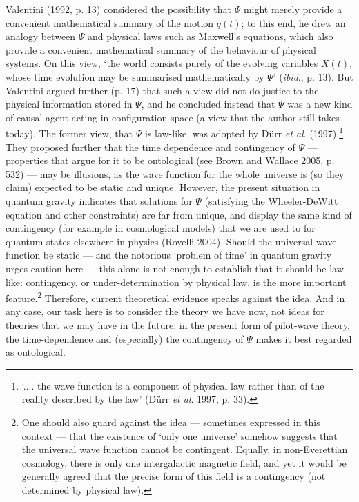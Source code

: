 \documentclass{article}%
\begin{document}
Valentini (1992, p. 13) considered the possibility that $\Psi$ might merely
provide a convenient mathematical summary of the motion $q(t)$; to this end,
he drew an analogy between $\Psi$ and physical laws such as Maxwell's
equations, which also provide a convenient mathematical summary of the
behaviour of physical systems. On this view, `the world consists purely of the
evolving variables $X(t)$, whose time evolution may be summarised
mathematically by $\Psi$' (\textit{ibid}., p. 13). But Valentini argued
further (p. 17) that such a view did not do justice to the physical
information stored in $\Psi$, and he concluded instead that $\Psi$ was a new
kind of causal agent acting in configuration space (a view that the author
still takes today). The former view, that $\Psi$ is law-like, was adopted by
D\"{u}rr \textit{et al}. (1997).\footnote{`.... the wave function is a
component of physical law rather than of the reality described by the law'
(D\"{u}rr \textit{et al}. 1997, p. 33).} They proposed further that the time
dependence and contingency of $\Psi$ --- properties that argue for it to be
ontological (see Brown and Wallace 2005, p. 532) --- may be illusions, as the
wave function for the whole universe is (so they claim) expected to be static
and unique. However, the present situation in quantum gravity indicates that
solutions for $\Psi$ (satisfying the Wheeler-DeWitt equation and other
constraints) are far from unique, and display the same kind of contingency
(for example in cosmological models) that we are used to for quantum states
elsewhere in physics (Rovelli 2004). Should the universal wave function be
static --- and the notorious `problem of time' in quantum gravity urges
caution here --- this alone is not enough to establish that it should be
law-like: contingency, or under-determination by physical law, is the more
important feature.\footnote{One should also guard against the idea ---
sometimes expressed in this context --- that the existence of `only one
universe' somehow suggests that the universal wave function cannot be
contingent. Equally, in non-Everettian cosmology, there is only one
intergalactic magnetic field, and yet it would be generally agreed that the
precise form of this field is a contingency (not determined by physical law).}
Therefore, current theoretical evidence speaks against the idea. And in any
case, our task here is to consider the theory we have now, not ideas for
theories that we may have in the future: in the present form of pilot-wave
theory, the time-dependence and (especially) the contingency of $\Psi$ makes
it best regarded as ontological.
\end{document}
